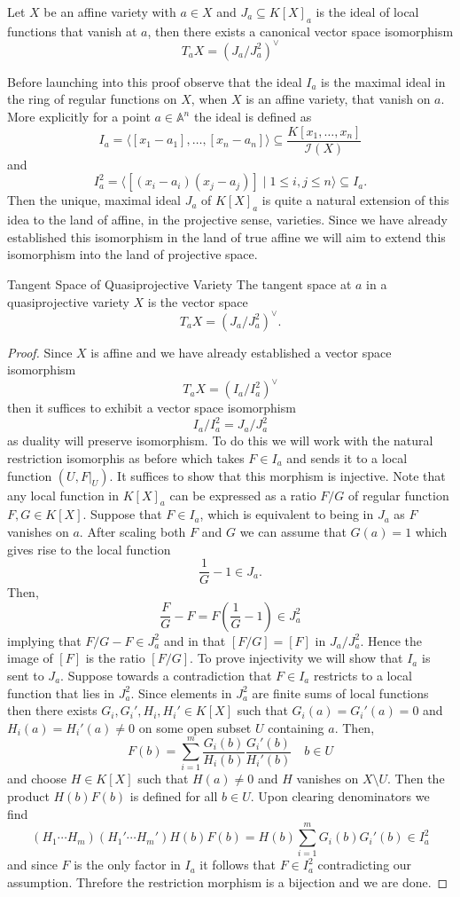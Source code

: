 \documentclass[40pt]{article}
\newcommand{\A}{\mathbb{A}}
\newcommand{\I}{\mathcal{I}}
\newcommand{\la}{\langle}
\newcommand{\ra}{\rangle}
\theoremstyle{remark}
\begin{document}
		\begin{prop}
			Let $X$ be an affine variety with $a\in X$ and $J_a \subseteq K[X]_a$ is the ideal of local functions that vanish at $a$, then there exists a canonical vector space isomorphism 
			\[
			T_aX = (J_a/J_a^2)^\vee
			\]
		\end{prop}
		Before launching into this proof observe that the ideal $I_a$ is the maximal ideal in the ring of regular functions on $X$, when $X$ is an affine variety, that vanish on $a$. More explicitly for a point $a \in \A^n$ the ideal is defined as 
		\[
		I_a = \la [x_1-a_1],\dots,[x_n-a_n]\ra \subseteq \frac{K[x_1,\dots,x_n]}{\I(X)}
		\]
		and
		\[
		I_a^2 = \la [(x_i - a_i)(x_j-a_j)] \; | \; 1 \leq i,j \leq n \ra \subseteq I_a.
		\]
		Then the unique, maximal ideal $J_a$ of $K[X]_a$ is quite a natural extension of this idea to the land of affine, in the projective sense, varieties. Since we have already established this isomorphism in the land of true affine we will aim to extend this isomorphism into the land of projective space. 
		\begin{mydef}{Tangent Space of Quasiprojective Variety}
			The tangent space at $a$ in a quasiprojective variety $X$ is the vector space
			\[
			T_aX = (J_a/J_a^2)^\vee.
			\]
		\end{mydef}
		\begin{proof}
			Since $X$ is affine and we have already established a vector space isomorphism 
			\[
			T_aX = (I_a/I_a^2)^\vee
			\]
			then it suffices to exhibit a vector space isomorphism 
			\[
			I_a/I_a^2 = J_a/J_a^2
			\]
			as duality will preserve isomorphism. To do this we will work with the natural restriction isomorphis as before which takes $F \in I_a$ and sends it to a local function $(U,F|_U)$. It suffices to show that this morphism is injective. Note that any local function in $K[X]_a$ can be expressed as a ratio $F/G$ of regular function $F,G \in K[X]$. Suppose that $F \in I_a$, which is equivalent to being in $J_a$ as $F$ vanishes on $a$. After scaling both $F$ and $G$ we can assume that $G(a) = 1$ which gives rise to the local function 
			\[
			\frac{1}{G} - 1 \in J_a.
			\]
			Then, 
			\[
			\frac{F}{G} - F = F\left(\frac{1}{G} - 1\right) \in J_a^2
			\]
			implying that $F/G - F \in J_a^2$ and in that $[F/G] = [F]$ in $J_a/J_a^2$. Hence the image of $[F]$ is the ratio $[F/G]$. To prove injectivity we will show that $I_a$ is sent to $J_a$. Suppose towards a contradiction that $F \in I_a$ restricts to a local function that lies in $J_a^2$. Since elements in $J_a^2$ are finite sums of local functions then there exists $G_i, G_i', H_i, H_i' \in K[X]$ such that $G_i(a) = G_i'(a) = 0$ and $H_i(a)=H_i'(a) \neq 0$ on some open subset $U$ containing $a$. Then,
			\[
			F(b) = \sum_{i=1}^m \frac{G_i(b)}{H_i(b)}\frac{G_i'(b)}{H_i'(b)} \quad b \in U
			\]
			and choose $H \in K[X]$ such that $H(a) \neq 0$ and $H$ vanishes on $X \setminus U$. Then the product $H(b)F(b)$ is defined for all $b \in U$. Upon clearing denominators we find 
			\[
			(H_1\cdots H_m)(H_1'\cdots H_m')H(b)F(b) = H(b)\sum_{i=1}^m G_i(b)G_i'(b) \in I_a^2
			\]
			and since $F$ is the only factor in $I_a$ it follows that $F \in I_a^2$ contradicting our assumption. Threfore the restriction morphism is a bijection and we are done. 
		\end{proof}
\end{document}
